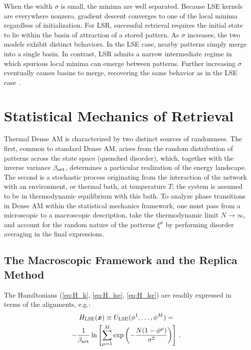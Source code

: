 \documentclass{article}
\theoremstyle{plain}
\theoremstyle{definition}
\theoremstyle{remark}
\begin{document}
When the width $\sigma$ is small, the minima are well separated. Because LSE kernels are everywhere nonzero, gradient descent converges to one of the local minima regardless of initialization. For LSR, successful retrieval requires the initial state to lie within the basin of attraction of a stored pattern. As $\sigma$ increases, the two models exhibit distinct behaviors. In the LSE case, nearby patterns simply merge into a single basin. In contrast, LSR admits a narrow intermediate regime in which spurious local minima can emerge between patterns. Further increasing $\sigma$ eventually causes basins to merge, recovering the same behavior as in the LSE case~\cite{hoover2025dense}.

\section{Statistical Mechanics of Retrieval}

Thermal Dense AM is characterized by two distinct sources of randomness. The first, common to standard Dense AM, arises from the random distribution of patterns across the state space (quenched disorder), which, together with the inverse variance $\beta_{\rm net}$, determines a particular realization of the energy landscape. The second is a stochastic process originating from the interaction of the network with an environment, or thermal bath, at temperature $T$; the system is assumed to be in thermodynamic equilibrium with this bath. To analyze phase transitions in Dense AM within the statistical mechanics framework, one must pass from a microscopic to a macroscopic description, take the thermodynamic limit $N \to \infty$, and account for the random nature of the patterns $\xi^\mu$ by performing disorder averaging in the final expressions.

\subsection{The Macroscopic Framework and the Replica Method}

The Hamiltonians (\ref{eq:H_k}, \ref{eq:H_lse}, \ref{eq:H_lsr}) are readily expressed in terms of the alignments, e.g.:
\begin{multline}
    H_{\rm LSE}(\bm{x}) \equiv U_{\rm LSE}(\phi^1, \dots, \phi^M) = \\ -\frac{1}{\beta_{\rm net}} \ln \left[ \sum_{\mu=1}^M \exp\left( -\frac{N(1 - \phi^\mu)}{\sigma^2} \right) \right]\,.
\end{multline}
\end{document}
